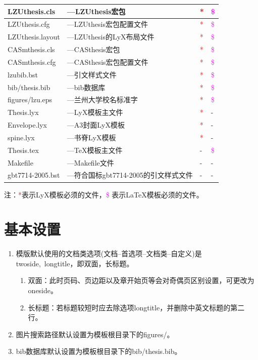 \documentclass[twoside,longtitle]{LZUthesis}
\begin{document}
\begin{tabular}{|l|l|l|l|}
\hline
LZUthesis.cls & ---LZUthesis宏包 & \textcolor{red}{{*}} & \textcolor{magenta}{\$}\tabularnewline
\hline
LZUthesis.cfg & ---LZUthesis宏包配置文件 & \textcolor{red}{{*}} & \textcolor{magenta}{\$}\\
\hline
LZUthesis.layout & ---LZUthesis的LyX布局文件 & \textcolor{red}{{*}} & \textcolor{magenta}{\$}\\
\hline
CASmthesis.cls & ---CASthesis宏包 & \textcolor{red}{{*}} & \textcolor{magenta}{\$}\\
\hline
CASmthesis.cfg & ---CASthesis宏包配置文件 & \textcolor{red}{{*}} & \textcolor{magenta}{\$}\\
\hline
lzubib.bst & ---引文样式文件 & \textcolor{red}{{*}} & \textcolor{magenta}{\$}\\
\hline
bib/thesis.bib & ---bib数据库 & \textcolor{red}{{*}} & \textcolor{magenta}{\$}\\
\hline
figures/lzu.eps & ---兰州大学校名标准字 & \textcolor{red}{{*}} & \textcolor{magenta}{\$}\\
\hline
Thesis.lyx & ---LyX模板主文件 & \textcolor{red}{{*}} & -\\
\hline
Envelope.lyx & ---A3封面LyX模板 & \textcolor{red}{{*}} & -\\
\hline
spine.lyx & ---书脊LyX模板 & \textcolor{red}{{*}} & -\\
\hline
Thesis.tex & ---\TeX{}模板主文件 & - & \textcolor{magenta}{\$}\\
\hline
Makefile & ---Makefile文件 & - & -\\
\hline
gbt7714-2005.bst & ---符合国标gbt7714-2005的引文样式文件 & - & -\\
\hline
\end{tabular}

注：\textcolor{red}{{*}}表示LyX模板必须的文件，\textcolor{magenta}{\$} 表示\LaTeX{}模板必须的文件。


\section{基本设置}
\begin{enumerate}
\item 模版默认使用的文档类选项(文档--首选项--文档类--自定义)是twoside,~longtitle，即双面，长标题。

\begin{enumerate}
\item 双面：此时页码、页边距以及章开始页等会对奇偶页区别设置，可更改为oneside。
\item 长标题：若标题较短时应去除选项longtitle，并删除中英文标题的第二行。
\end{enumerate}
\item 图片搜索路径默认设置为模板根目录下的figures/。
\item bib数据库默认设置为模板根目录下的bib/thesis.bib。
\end{enumerate}
\end{document}
